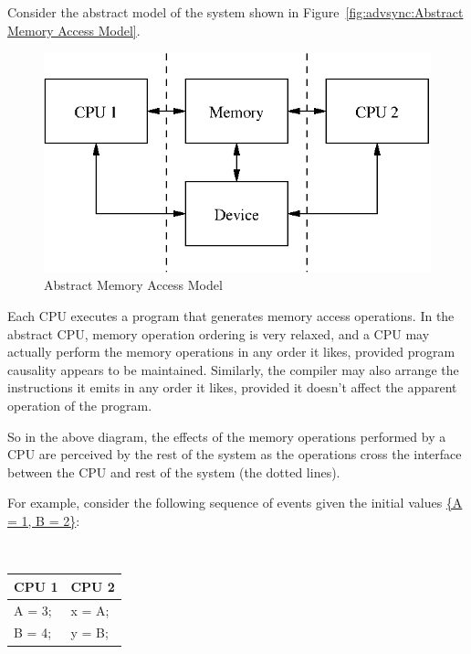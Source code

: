 Consider the abstract model of the system shown in
Figure~\ref{fig:advsync:Abstract Memory Access Model}.

\begin{figure}[htb]
\begin{center}
\includegraphics{advsync/AbstractMemoryAccessModel}
\end{center}
\caption{Abstract Memory Access Model}
\end{figure}

Each CPU executes a program that generates memory access operations.  In the
abstract CPU, memory operation ordering is very relaxed, and a CPU may actually
perform the memory operations in any order it likes, provided program causality
appears to be maintained.  Similarly, the compiler may also arrange the
instructions it emits in any order it likes, provided it doesn't affect the
apparent operation of the program.

So in the above diagram, the effects of the memory operations performed by a
CPU are perceived by the rest of the system as the operations cross the
interface between the CPU and rest of the system (the dotted lines).


For example, consider the following sequence of events given the
initial values \url{{A = 1, B = 2}}:

\vspace{5pt}
\begin{minipage}[t]{\columnwidth}
\tt
\begin{tabular}{l|l}
	CPU 1 &		CPU 2 \\
	\hline
	A = 3; &	x = A; \\
	B = 4; &	y = B; \\
\end{tabular}
\end{minipage}
\vspace{5pt}

